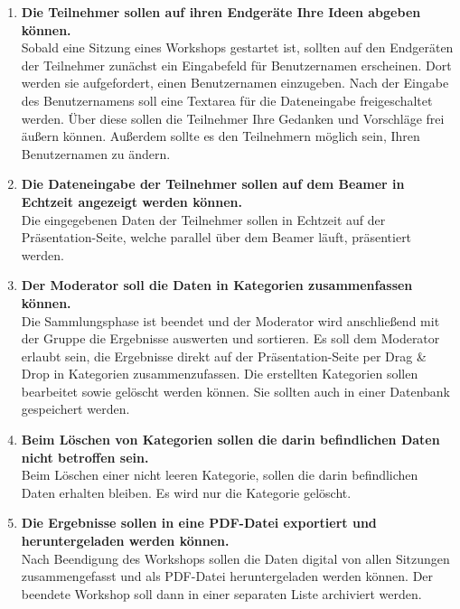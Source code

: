 \begin{enumerate}
Zu Beginn des Workshops sollte ein QR\footnote{englisch: Quick Response}-Code mittels Beamer angezeigt werden, sodass die anwesenden Teilnehmer diesen mit ihren Mobilgeräten einscannen und an diesem Workshop mitwirken können. Der Moderator sollte auch die Möglichkeit haben, auch während einer Sitzung den QR-Code einblenden zu können. Die Einladung zur Teilnahme am Workshop sollte ebenfalls auch per Mail gesendet werden können.
\item \textbf{Die Teilnehmer sollen auf ihren Endgeräte Ihre Ideen abgeben können.}\\
Sobald eine Sitzung eines Workshops gestartet ist, sollten auf den Endgeräten der Teilnehmer zunächst ein Eingabefeld für Benutzernamen erscheinen. Dort werden sie aufgefordert, einen Benutzernamen einzugeben. Nach der Eingabe des Benutzernamens soll eine Textarea für die Dateneingabe freigeschaltet werden. Über diese sollen die Teilnehmer Ihre Gedanken und Vorschläge frei äußern können. Außerdem sollte es den Teilnehmern möglich sein, Ihren Benutzernamen zu ändern.
\item \textbf{Die Dateneingabe der Teilnehmer sollen auf dem Beamer in Echtzeit angezeigt werden können.} \\
Die eingegebenen Daten der Teilnehmer sollen in Echtzeit auf der Präsentation-Seite, welche parallel über dem Beamer läuft, präsentiert werden.
\item \textbf{Der Moderator soll die Daten in Kategorien zusammenfassen können.}\\
Die Sammlungsphase ist beendet und der Moderator wird anschließend mit der Gruppe die Ergebnisse auswerten und sortieren. Es soll dem Moderator erlaubt sein, die Ergebnisse direkt auf der Präsentation-Seite per Drag \& Drop in Kategorien zusammenzufassen. Die erstellten Kategorien sollen bearbeitet sowie gelöscht werden können. Sie sollten auch in einer Datenbank gespeichert werden.
\item \textbf{Beim Löschen von Kategorien sollen die darin befindlichen Daten nicht betroffen sein.}\\
Beim Löschen einer nicht leeren Kategorie, sollen die darin befindlichen Daten erhalten bleiben. Es wird nur die Kategorie gelöscht.
\item \textbf{Die Ergebnisse sollen in eine PDF-Datei exportiert und heruntergeladen werden können.}\\
Nach Beendigung des Workshops sollen die Daten digital von allen Sitzungen zusammengefasst und als PDF-Datei heruntergeladen werden können. Der beendete Workshop soll dann in einer separaten Liste archiviert werden.
\end{enumerate}

